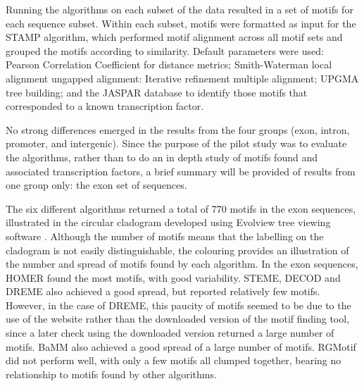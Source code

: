 \documentclass[12pt]{article}
\begin{document}
Running the algorithms on each subset of the data resulted in a set of motifs for each sequence subset. Within each subset, motifs were formatted as input for the STAMP algorithm, which performed motif alignment across all motif sets and grouped the motifs according to similarity. Default parameters were used: Pearson Correlation Coefficient for distance metrics; Smith-Waterman local alignment ungapped alignment: Iterative refinement multiple alignment; UPGMA tree building; and the JASPAR database \citep{sandelin2004jaspar} to identify those motifs that corresponded to a known transcription factor.  

No strong differences emerged in the results from the four groups (exon, intron, promoter, and intergenic). Since the purpose of the pilot study was to evaluate the algorithms, rather than to do an in depth study of motifs found and associated transcription factors, a brief summary will be provided of results from one group only: the exon set of sequences. 

The six different algorithms returned a total of 770 motifs in the exon sequences, illustrated in the circular cladogram developed using Evolview tree viewing software  \citep{He2016}. Although the number of motifs means that the labelling on the cladogram is not easily distinguishable, the colouring provides an illustration of the number and spread of motifs found by each algorithm. In the exon sequences, HOMER found the most motifs, with good variability. STEME, DECOD and DREME also achieved a good spread, but reported relatively few motifs. However, in the case of DREME, this paucity of motifs seemed to be due to the use of the website rather than the downloaded version of the motif finding tool, since a later check using the downloaded version returned a large number of motifs. BaMM also achieved a good spread of a large number of motifs. RGMotif did not perform well, with only a few motifs all clumped together, bearing no relationship to motifs found by other algorithms.
\end{document}
